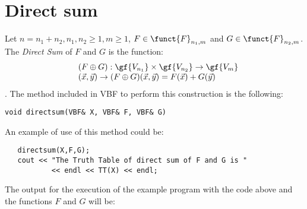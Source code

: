 \section{Direct sum}

Let $n=n_1+n_2, n_1,n_2 \geq 1, m \geq 1$, $F \in \funct{F}_{n_1,m}$
  and $G \in \funct{F}_{n_2,m}$. The \textsl{Direct Sum} of $F$ and $G$
  is the function: 
\begin{equation}
\begin{array}{ll}
   &(F \oplus G):\gf{V_{n_1}} \times \gf{V_{n_2}} \to \gf{V_m} \\
	&(\vec{x},\vec{y}) \to (F \oplus G)(\vec{x},\vec{y}) = F(\vec{x}) + G(\vec{y}) 
\end{array}
\end{equation}.
The method included in VBF to perform this construction is the following:

\begin{verbatim}
void directsum(VBF& X, VBF& F, VBF& G)  
\end{verbatim}

An example of use of this method could be:

\begin{verbatim}
   directsum(X,F,G);
   cout << "The Truth Table of direct sum of F and G is " 
           << endl << TT(X) << endl;
\end{verbatim}

The output for the execution of the example program with the code above and the functions $F$ and $G$ will be:

